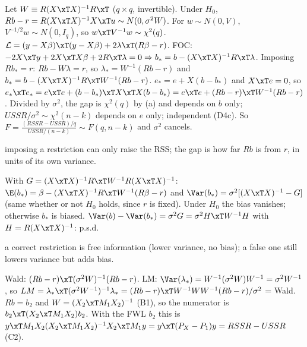 \begin{solbox}
Let $W\equiv R(X\xT X)^{-1}R\xT$ ($q\times q$, invertible).
 Under $H_{0}$, $Rb-r=R(X\xT X)^{-1}X\xT u\sim N(0,\sigma^{2}W)$. For $w\sim N(0,V)$, $V^{-1/2}w\sim N(0,I_{q})$, so $w\xT V^{-1}w\sim\chi^{2}(q)$.
 $\mathcal L=(y-X\beta)\xT(y-X\beta)+2\lambda\xT(R\beta-r)$. FOC: $-2X\xT y+2X\xT X\beta+2R\xT\lambda=0\Rightarrow b_{*}=b-(X\xT X)^{-1}R\xT\lambda$.
Imposing $Rb_{*}=r$: $Rb-W\lambda=r$, so
$\lambda_{*}=W^{-1}(Rb-r)$ and $b_{*}=b-(X\xT X)^{-1}R\xT W^{-1}(Rb-r)$.
 $e_{*}=e+X(b-b_{*})$ and $X\xT e=0$, so
$e_{*}\xT e_{*}=e\xT e+(b-b_{*})\xT X\xT X(b-b_{*})=e\xT e+(Rb-r)\xT W^{-1}(Rb-r)$.
Divided by $\sigma^{2}$, the gap is $\chi^{2}(q)$ by (a) and depends on $b$ only; $USSR/\sigma^{2}\sim\chi^{2}(n-k)$ depends on $e$ only; independent (D4c). So
$F=\frac{(RSSR-USSR)/q}{USSR/(n-k)}\sim F(q,n-k)$ and $\sigma^{2}$ cancels.
\begin{why}\Why imposing a restriction can only raise the RSS; the gap is how far $Rb$ is from $r$, in units of its own variance.\end{why}
 With $G=(X\xT X)^{-1}R\xT W^{-1}R(X\xT X)^{-1}$:
$\E(b_{*})=\beta-(X\xT X)^{-1}R\xT W^{-1}(R\beta-r)$ and $\Var(b_{*})=\sigma^{2}[(X\xT X)^{-1}-G]$ (same whether or not $H_{0}$ holds, since $r$ is fixed).
Under $H_{0}$ the bias vanishes; otherwise $b_{*}$ is biased. $\Var(b)-\Var(b_{*})=\sigma^{2}G=\sigma^{2}H\xT W^{-1}H$ with $H=R(X\xT X)^{-1}$: p.s.d.
\begin{why}\Why a correct restriction is free information (lower variance, no bias); a false one still lowers variance but adds bias.\end{why}
 Wald: $(Rb-r)\xT(\sigma^{2}W)^{-1}(Rb-r)$. LM: $\Var(\lambda_{*})=W^{-1}(\sigma^{2}W)W^{-1}=\sigma^{2}W^{-1}$, so
$LM=\lambda_{*}\xT(\sigma^{2}W^{-1})^{-1}\lambda_{*}=(Rb-r)\xT W^{-1}WW^{-1}(Rb-r)/\sigma^{2}$ = Wald.
 $Rb=b_{2}$ and $W=(X_{2}\xT M_{1}X_{2})^{-1}$ (B1), so the numerator is $b_{2}\xT(X_{2}\xT M_{1}X_{2})b_{2}$. With the FWL $b_{2}$ this is
$y\xT M_{1}X_{2}(X_{2}\xT M_{1}X_{2})^{-1}X_{2}\xT M_{1}y=y\xT(P_{X}-P_{1})y=RSSR-USSR$ (C2).
\end{solbox}

